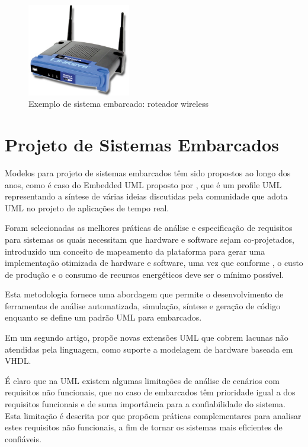\begin{figure}[h!]
			\centering
			\includegraphics[width=0.4\textwidth]{figures/embarcado_exemplo.jpg}
			\caption{Exemplo de sistema embarcado: roteador wireless}
			\label{fig:roteador}
	\end{figure}


\hfill

\section{Projeto de Sistemas Embarcados}

Modelos para projeto de sistemas embarcados têm sido propostos ao longo dos anos, como é caso do Embedded UML proposto por \textcite{Martin:2001}, que é um profile UML representando a síntese de várias ideias discutidas pela comunidade que adota UML no projeto de aplicações de tempo real. 

Foram selecionadas as melhores práticas de análise e especificação de requisitos para sistemas os quais necessitam que hardware e software sejam co-projetados, introduzido um conceito de mapeamento da plataforma para gerar uma implementação otimizada de hardware e software, uma vez que conforme \textcite{Wolf:2001}, o custo de produção e o consumo de recursos energéticos deve ser o mínimo possível.

Esta metodologia fornece uma abordagem que permite o desenvolvimento de ferramentas de análise automatizada, simulação, síntese e geração de código enquanto se define um padrão UML para embarcados.

Em um segundo artigo, \textcite{Martin:2002} propõe novas extensões UML que cobrem lacunas não atendidas pela linguagem, como suporte a modelagem de hardware baseada em VHDL.

É claro que na UML existem algumas limitações de análise de cenários com requisitos não funcionais, que no caso de embarcados têm prioridade igual a dos requisitos funcionais e de suma importância para a confiabilidade do sistema. Esta limitação é descrita por \textcite{Espinoza:2008} que propõem práticas complementares para analisar estes requisitos não funcionais, a fim de tornar os sistemas mais eficientes de confiáveis.

